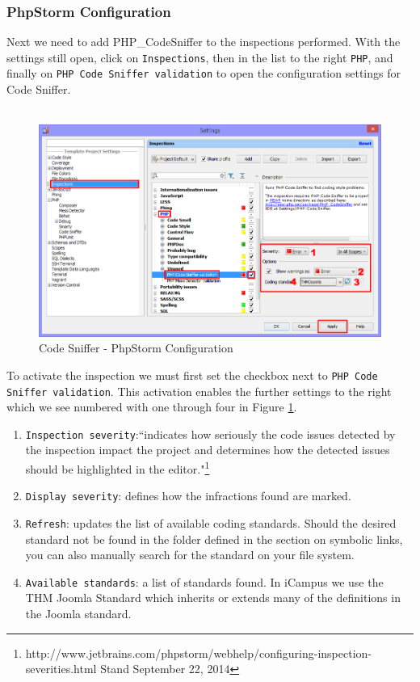 \documentclass[]{report}
\begin{document}
\subsubsection{PhpStorm Configuration}

Next we need to add PHP\_CodeSniffer to the inspections performed. With the settings still open, click on \texttt{Inspections}, then in the list to the right \texttt{PHP}, and finally on \texttt{PHP Code Sniffer validation} to open the configuration settings for Code Sniffer.\\
\\
\begin{figure}[h] 
	\centering
	\includegraphics[width=14cm]{codesnifferconfiguration.png}
	\caption{Code Sniffer - PhpStorm Configuration}
	\label{fig:cspsc}
\end{figure}

\noindent
To activate the inspection we must first set the checkbox next to \texttt{PHP Code Sniffer validation}. This activation enables the further settings to the right which we see numbered with one through four in Figure \ref{fig:cspsc}.

\begin{enumerate}
	\item \texttt{Inspection severity}:``indicates how seriously the code issues detected by the inspection impact the project and determines how the detected issues should be highlighted in the editor."\footnote{http://www.jetbrains.com/phpstorm/webhelp/configuring-inspection-severities.html Stand September 22, 2014}
	\item \texttt{Display severity}: defines how the infractions found are marked.
	\item \texttt{Refresh}: updates the list of available coding standards. Should the desired standard not be found in the folder defined in the section on symbolic links, you can also manually search for the standard on your file system.
	\item \texttt{Available standards}: a list of standards found. In iCampus we use the THM Joomla Standard which inherits or extends many of the definitions in the Joomla standard.
\end{enumerate}
\end{document}
